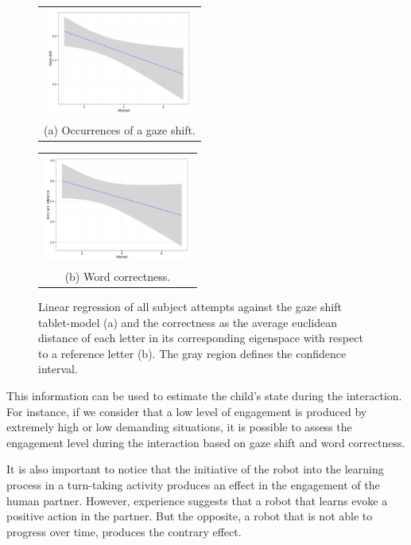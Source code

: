 \documentclass{sig-alternate}
\begin{document}
\begin{figure}
  \centering
  \begin{tabular}{@{}c@{}}
    \includegraphics[width=.7\linewidth,height=100pt]{gazeR} \\
    \small (a) Occurrences of a gaze shift.
  \end{tabular}\label{fig:gazeR}

  \vspace{\floatsep}

  \begin{tabular}{@{}c@{}}
    \includegraphics[width=.7\linewidth,height=100pt]{errorR} \\
    \small (b) Word correctness.
  \end{tabular}\label{fig:errorR}

  \caption{ \small Linear regression of all subject attempts against the gaze
  shift tablet-model (a) and the correctness as the average euclidean distance
  of each letter in its corresponding eigenspace with respect to a reference
  letter (b). The gray region defines the confidence interval.}
  
\end{figure}


This information can be used to estimate the child's state during the
interaction. For instance, if we consider that a low level of engagement is
produced by extremely high or low demanding situations, it is possible to assess
the engagement level during the interaction based on gaze shift and word
correctness.

It is also important to notice that the initiative of the robot into the
learning process in a turn-taking activity produces an effect in the engagement
of the human partner. However, experience suggests that a robot that learns
evoke a positive action in the partner. But the opposite, a robot that is not
able to progress over time, produces the contrary effect.
\end{document}

